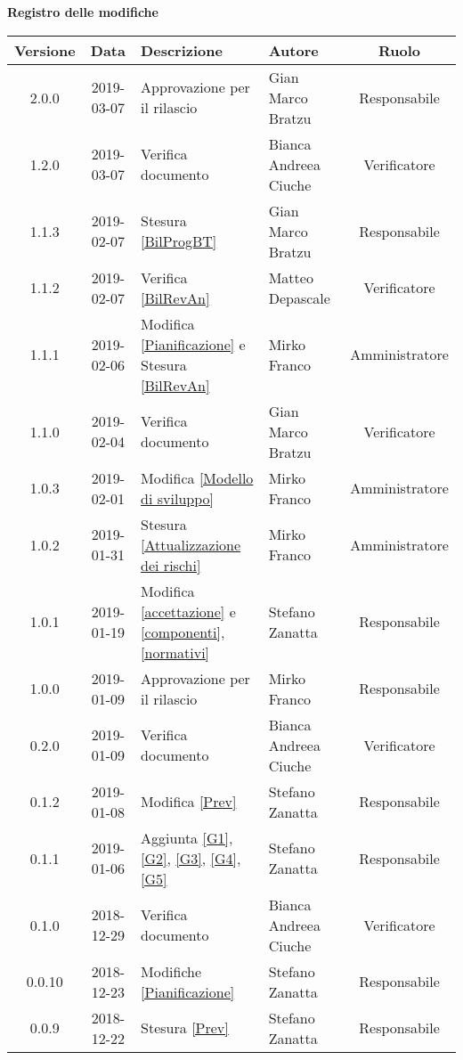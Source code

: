 	\begin{center}
		\textbf{Registro delle modifiche}
	\end{center}
	\begin{center}
		\begin{tabularx}{\textwidth}{|c|c|X|X|c|}
			\hline
			\textbf{Versione} & \textbf{Data} & \textbf{Descrizione} & \textbf{Autore} & \textbf{Ruolo} \\
			\hline
			2.0.0 & 2019-03-07 & Approvazione per il rilascio & Gian Marco Bratzu & Responsabile \\			
			\hline
			1.2.0 & 2019-03-07 & Verifica documento & Bianca Andreea Ciuche & Verificatore \\			
			\hline
			1.1.3 & 2019-02-07 & Stesura \ref{BilProgBT} & Gian Marco Bratzu & Responsabile \\			
			\hline
			1.1.2 & 2019-02-07 & Verifica \ref{BilRevAn} & Matteo Depascale & Verificatore \\
			\hline
			1.1.1 & 2019-02-06 & Modifica \ref{Pianificazione} e Stesura \ref{BilRevAn} & Mirko Franco & Amministratore \\
			\hline
			1.1.0 & 2019-02-04 & Verifica documento & Gian Marco Bratzu & Verificatore\\
			\hline
			1.0.3 & 2019-02-01 & Modifica \ref{Modello di sviluppo} & Mirko Franco & Amministratore \\
			\hline
			1.0.2 & 2019-01-31 & Stesura \ref{Attualizzazione dei rischi} & Mirko Franco & Amministratore \\
			\hline
			1.0.1 & 2019-01-19 & Modifica \ref{accettazione} e \ref{componenti},\ref{normativi} & Stefano Zanatta & Responsabile\\
			\hline
			1.0.0 & 2019-01-09 & Approvazione per il rilascio & Mirko Franco & Responsabile\\
			\hline
			0.2.0 & 2019-01-09 & Verifica documento & Bianca Andreea Ciuche& Verificatore\\
			\hline
			0.1.2 & 2019-01-08 & Modifica \ref{Prev}& Stefano Zanatta & Responsabile\\
			\hline
			0.1.1 & 2019-01-06 & Aggiunta \ref{G1}, \ref{G2}, \ref{G3}, \ref{G4}, \ref{G5} & Stefano Zanatta & Responsabile\\
			\hline
			0.1.0 & 2018-12-29 & Verifica documento & Bianca Andreea Ciuche& Verificatore\\
			\hline
			0.0.10 & 2018-12-23 & Modifiche \ref{Pianificazione} & Stefano Zanatta & Responsabile\\
			\hline
			0.0.9 & 2018-12-22 & Stesura \ref{Prev} & Stefano Zanatta & Responsabile\\

\end{tabularx}
\end{center}

